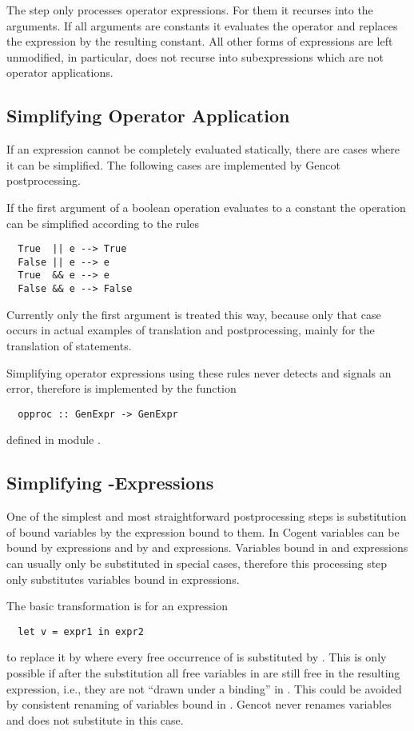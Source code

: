 The  step only processes operator expressions. For them it recurses into the arguments. If all arguments
are constants it evaluates the operator and replaces the expression by the resulting constant. All other forms
of expressions are left unmodified, in particular,  does not recurse into subexpressions which are
not operator applications.

\subsection{Simplifying Operator Application}
\label{impl-post-op}

If an expression cannot be completely evaluated statically, there are cases where it can be simplified.
The following cases are implemented by Gencot postprocessing.

If the first argument of a boolean operation evaluates to a constant the operation can be simplified according 
to the rules
\begin{verbatim}
  True  || e --> True
  False || e --> e
  True  && e --> e
  False && e --> False
\end{verbatim}
Currently only the first argument is treated this way, because only that case occurs in actual examples of translation
and postprocessing, mainly for the translation of  statements.

Simplifying operator expressions using these rules never detects and signals an error, therefore is implemented by the function
\begin{verbatim}
  opproc :: GenExpr -> GenExpr
\end{verbatim}
defined in module .

\subsection{Simplifying -Expressions}
\label{impl-post-let}

One of the simplest and most straightforward postprocessing steps is substitution of bound variables by the
expression bound to them. In Cogent variables can be bound by  expressions and by  and 
expressions. Variables bound in  and  expressions can usually only be substituted in special cases, 
therefore this processing step only substitutes variables bound in  expressions. 

The basic transformation is for an expression
\begin{verbatim}
  let v = expr1 in expr2
\end{verbatim}
to replace it by  where every free occurrence of  is substituted by . This is only 
possible if after the substitution all free variables in  are still free in the resulting expression, i.e., 
they are not ``drawn under a binding'' in . This could be avoided by consistent renaming of variables bound in 
. Gencot never renames variables and does not substitute in this case.

